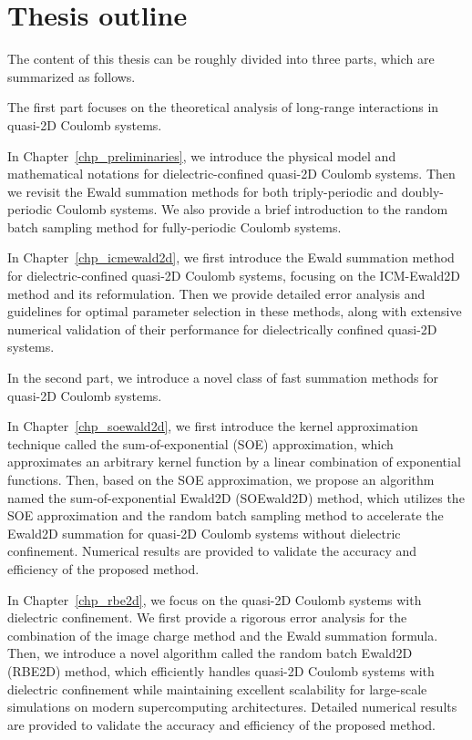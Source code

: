 \section{Thesis outline}

The content of this thesis can be roughly divided into three parts, which are summarized as follows.

The first part focuses on the theoretical analysis of long-range interactions in quasi-2D Coulomb systems.

In Chapter~\ref{chp_preliminaries}, we introduce the physical model and mathematical notations for dielectric-confined quasi-2D Coulomb systems.
Then we revisit the Ewald summation methods for both triply-periodic and doubly-periodic Coulomb systems.
We also provide a brief introduction to the random batch sampling method for fully-periodic Coulomb systems.

In Chapter~\ref{chp_icmewald2d}, we first introduce the Ewald summation method for dielectric-confined quasi-2D Coulomb systems, focusing on the ICM-Ewald2D method and its reformulation.
Then we provide detailed error analysis and guidelines for optimal parameter selection in these methods, along with extensive numerical validation of their performance for dielectrically confined quasi-2D systems.

In the second part, we introduce a novel class of fast summation methods for quasi-2D Coulomb systems.

In Chapter~\ref{chp_soewald2d}, we first introduce the kernel approximation technique called the sum-of-exponential (SOE) approximation, which approximates an arbitrary kernel function by a linear combination of exponential functions.
Then, based on the SOE approximation, we propose an algorithm named the sum-of-exponential Ewald2D (SOEwald2D) method, which utilizes the SOE approximation and the random batch sampling method to accelerate the Ewald2D summation for quasi-2D Coulomb systems without dielectric confinement.
Numerical results are provided to validate the accuracy and efficiency of the proposed method.

In Chapter~\ref{chp_rbe2d}, we focus on the quasi-2D Coulomb systems with dielectric confinement.
We first provide a rigorous error analysis for the combination of the image charge method and the Ewald summation formula.
Then, we introduce a novel algorithm called the random batch Ewald2D (RBE2D) method, which efficiently handles quasi-2D Coulomb systems with dielectric confinement while maintaining excellent scalability for large-scale simulations on modern supercomputing architectures.
Detailed numerical results are provided to validate the accuracy and efficiency of the proposed method.

